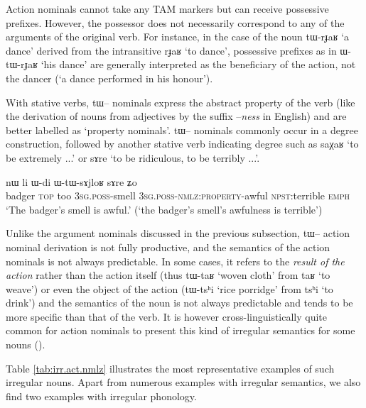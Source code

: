 \documentclass[oldfontcommands,oneside,a4paper,11pt]{article}
\newcommand{\ipa}[1]{{\phon \mbox{#1}}} %
\begin{document}
Action nominals cannot take any TAM markers but  can receive possessive prefixes. However, the possessor does not   necessarily correspond to any of the arguments of the original verb. For instance, in the case of the noun \ipa{tɯ-rɟaʁ} `a dance' derived from the intransitive \ipa{rɟaʁ} `to dance', possessive prefixes as in  \ipa{ɯ-tɯ-rɟaʁ} `his dance' are generally interpreted as the beneficiary of the action, not the dancer (`a dance performed in his honour').



With stative verbs, \ipa{tɯ}-- nominals express the abstract property of the verb (like the derivation of  nouns from adjectives by the suffix --\textit{ness} in English) and are better labelled as `property nominals'.  \ipa{tɯ}-- nominals  commonly occur in a degree construction, followed by another stative verb indicating degree such as \ipa{saχaʁ} `to be extremely ...' or \ipa{sɤre} `to be ridiculous, to be terribly ...'.
\begin{exe}
\ex
\gll \ipa{βɣɯz}   	\ipa{nɯ}   	\ipa{li}   	\ipa{ɯ-di}   	\ipa{ɯ-tɯ-sɤjloʁ}   	\ipa{sɤre}   	\ipa{ʑo}   \\
badger \textsc{top} too \textsc{3sg.poss}-smell \textsc{3sg.poss}-\textsc{nmlz:property}-awful \textsc{npst}:terrible \textsc{emph} \\
\glt `The badger's smell is awful.' (`the badger's smell's awfulness is terrible')
\end{exe}

 
Unlike the argument nominals discussed in the previous subsection,   \ipa{tɯ}-- action nominal derivation is not fully productive, and the semantics of the action nominals is not always predictable. In some cases, it refers  to the \textit{result of the action} rather than the action itself (thus \ipa{tɯ-taʁ} `woven cloth' from \ipa{taʁ} `to weave') or even the object of the action (\ipa{tɯ-tsʰi} `rice porridge' from \ipa{tsʰi} `to drink') and the semantics of the noun is not always predictable and tends to be more specific than that of the verb. It is however cross-linguistically quite common for action nominals to  present this kind of irregular semantics for some nouns (\citealt[20-21]{koptjevskaja93nmlz}). 

Table \ref{tab:irr.act.nmlz} illustrates the most representative examples of such irregular nouns. Apart from numerous examples with irregular semantics, we also find two examples with irregular phonology. 
\end{document}
